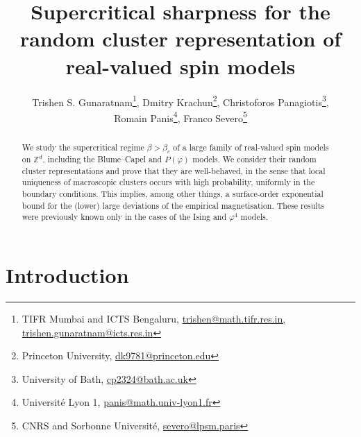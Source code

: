 \documentclass[11pt,a4paper]{article}
\title{Supercritical sharpness for the random cluster representation of real-valued spin models}
\date{}
\numberwithin{equation}{section}
\theoremstyle{plain}
\theoremstyle{definition}
\begin{document}
\author{Trishen S. Gunaratnam\footnote{TIFR Mumbai and ICTS Bengaluru, \url{trishen@math.tifr.res.in, trishen.gunaratnam@icts.res.in}}\:,  Dmitry Krachun\footnote{Princeton University, \url{dk9781@princeton.edu}}\:, Christoforos Panagiotis\footnote{University of Bath, \url{cp2324@bath.ac.uk}}\:, \\ Romain Panis\footnote{Université Lyon 1, 
\url{panis@math.univ-lyon1.fr}}\:, Franco Severo\footnote{CNRS and Sorbonne Université, \url{severo@lpsm.paris}}}

\maketitle

\begin{abstract}
We study the supercritical regime $\beta>\beta_c$ of a large family of real-valued spin models on $\mathbb Z^d$, including the Blume--Capel and $P(\varphi)$ models. We consider their random cluster representations and prove that they are well-behaved, in the sense that local uniqueness of macroscopic clusters occurs with high probability, uniformly in the boundary conditions. This implies, among other things, a surface-order exponential bound for the (lower) large deviations of the empirical magnetisation. These results were previously known only in the cases of the Ising and $\varphi^4$ models.
\end{abstract}



\setcounter{tocdepth}{2}
    
\section{Introduction}\label{sec:intro}
\end{document}
